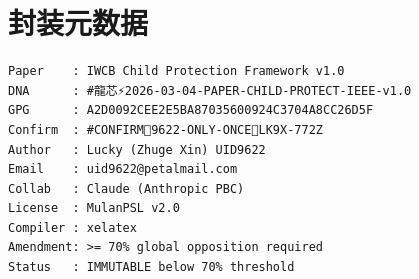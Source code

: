\documentclass[conference]{IEEEtran}
\begin{document}
\section{封装元数据}

\begin{small}
\begin{verbatim}
Paper    : IWCB Child Protection Framework v1.0
DNA      : #龍芯⚡️2026-03-04-PAPER-CHILD-PROTECT-IEEE-v1.0
GPG      : A2D0092CEE2E5BA87035600924C3704A8CC26D5F
Confirm  : #CONFIRM🌌9622-ONLY-ONCE🧬LK9X-772Z
Author   : Lucky (Zhuge Xin) UID9622
Email    : uid9622@petalmail.com
Collab   : Claude (Anthropic PBC)
License  : MulanPSL v2.0
Compiler : xelatex
Amendment: >= 70% global opposition required
Status   : IMMUTABLE below 70% threshold
\end{verbatim}
\end{small}
\end{document}
